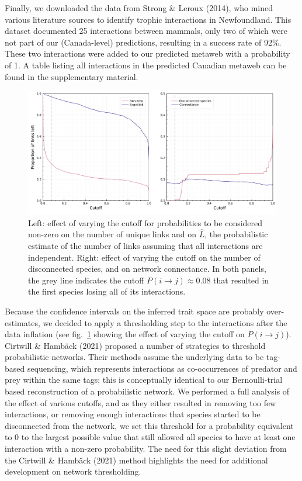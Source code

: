 \documentclass[10pt,oneside]{article}
\makeatletter
\def\maxwidth{\ifdim\Gin@nat@width>\linewidth\linewidth
\else\Gin@nat@width\fi}
\let\Oldincludegraphics\includegraphics
\renewcommand{\includegraphics}[1]{\Oldincludegraphics[width=\maxwidth]{#1}}
\makeatother
\begin{document}
Finally, we downloaded the data from Strong \& Leroux (2014), who mined
various literature sources to identify trophic interactions in
Newfoundland. This dataset documented 25 interactions between mammals,
only two of which were not part of our (Canada-level) predictions,
resulting in a success rate of 92\%. These two interactions were added
to our predicted metaweb with a probability of 1. A table listing all
interactions in the predicted Canadian metaweb can be found in the
supplementary material.

\begin{figure}
\hypertarget{fig:thresholds}{%
\centering
\includegraphics{figures/figure-cutoffs.png}
\caption{Left: effect of varying the cutoff for probabilities to be
considered non-zero on the number of unique links and on \(\hat{L}\),
the probabilistic estimate of the number of links assuming that all
interactions are independent. Right: effect of varying the cutoff on the
number of disconnected species, and on network connectance. In both
panels, the grey line indicates the cutoff
\(P(i\rightarrow j) \approx 0.08\) that resulted in the first species
losing all of its interactions.}\label{fig:thresholds}
}
\end{figure}

Because the confidence intervals on the inferred trait space are
probably over-estimates, we decided to apply a thresholding step to the
interactions after the data inflation (see fig.~\ref{fig:thresholds}
showing the effect of varying the cutoff on \(P(i \rightarrow j)\)).
Cirtwill \& Hambäck (2021) proposed a number of strategies to threshold
probabilistic networks. Their methods assume the underlying data to be
tag-based sequencing, which represents interactions as co-occurrences of
predator and prey within the same tags; this is conceptually identical
to our Bernoulli-trial based reconstruction of a probabilistic network.
We performed a full analysis of the effect of various cutoffs, and as
they either resulted in removing too few interactions, or removing
enough interactions that species started to be disconnected from the
network, we set this threshold for a probability equivalent to 0 to the
largest possible value that still allowed all species to have at least
one interaction with a non-zero probability. The need for this slight
deviation from the Cirtwill \& Hambäck (2021) method highlights the need
for additional development on network thresholding.
\end{document}
